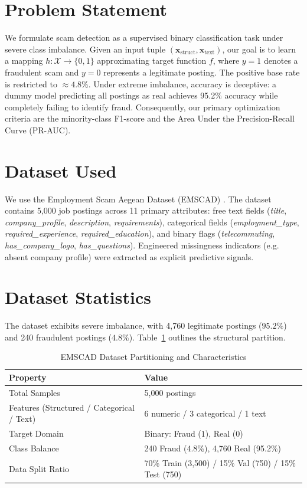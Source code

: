 \documentclass[10pt,journal,compsoc,twocolumn]{IEEEtran}
\begin{document}
\section{Problem Statement}
We formulate scam detection as a supervised binary classification task under severe class imbalance. Given an input tuple $(\mathbf{x}_{\text{struct}}, \mathbf{x}_{\text{text}})$, our goal is to learn a mapping $h: \mathcal{X} \to \{0, 1\}$ approximating target function $f$, where $y=1$ denotes a fraudulent scam and $y=0$ represents a legitimate posting. The positive base rate is restricted to $\approx 4.8\%$. Under extreme imbalance, accuracy is deceptive: a dummy model predicting all postings as real achieves 95.2\% accuracy while completely failing to identify fraud. Consequently, our primary optimization criteria are the minority-class F1-score and the Area Under the Precision-Recall Curve (PR-AUC).

\section{Dataset Used}
We use the Employment Scam Aegean Dataset (EMSCAD) \cite{vidros2017fake}. The dataset contains 5,000 job postings across 11 primary attributes: free text fields (\textit{title}, \textit{company\_profile}, \textit{description}, \textit{requirements}), categorical fields (\textit{employment\_type}, \textit{required\_experience}, \textit{required\_education}), and binary flags (\textit{telecommuting}, \textit{has\_company\_logo}, \textit{has\_questions}). Engineered missingness indicators (e.g. absent company profile) were extracted as explicit predictive signals.

\section{Dataset Statistics}
The dataset exhibits severe imbalance, with 4,760 legitimate postings ($95.2\%$) and 240 fraudulent postings ($4.8\%$). Table~\ref{tab:dataset_stats} outlines the structural partition.

\begin{table}[htbp]
\centering
\caption{EMSCAD Dataset Partitioning and Characteristics}
\label{tab:dataset_stats}
\begin{tabular}{ll}
\toprule
\textbf{Property} & \textbf{Value} \\
\midrule
Total Samples & 5,000 postings \\
Features (Structured / Categorical / Text) & 6 numeric / 3 categorical / 1 text \\
Target Domain & Binary: Fraud ($1$), Real ($0$) \\
Class Balance & 240 Fraud (4.8\%), 4,760 Real (95.2\%) \\
Data Split Ratio & 70\% Train (3,500) / 15\% Val (750) / 15\% Test (750) \\
\bottomrule
\end{tabular}
\end{table}
\end{document}
